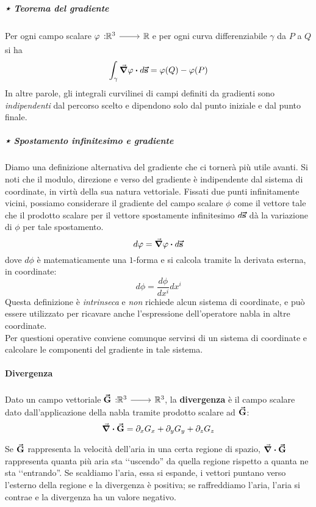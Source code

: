 \subparagraph{⋆ Teorema del gradiente}
\begin{theoremaqed}\label{thmgradiente}
	Per ogni campo scalare $\funz[\phi]{\realset^3}{\realset}$ e per ogni curva differenziabile $\gamma$ da $P$ a $Q$ si ha
	\begin{equation}
		\int_{\gamma}\grad{\phi}\vdot d\vba{s}=\phi(Q)-\phi(P)
	\end{equation}
	In altre parole, gli integrali curvilinei di campi definiti da gradienti sono \textit{indipendenti} dal percorso scelto e dipendono solo dal punto iniziale e dal punto finale.
\end{theoremaqed}
\subparagraph{⋆ Spostamento infinitesimo e gradiente}
Diamo una definizione alternativa del gradiente che ci tornerà più utile avanti. Si noti che il modulo, direzione e verso del gradiente è indipendente dal sistema di coordinate, in virtù della sua natura vettoriale. Fissati due punti infinitamente vicini, possiamo considerare il gradiente del campo scalare $\phi$ come il vettore tale che il prodotto scalare per il vettore spostamente infinitesimo $d\vb*{\va{s}}$ dà la variazione di $\phi$ per tale spostamento.
\begin{equation}
	d\phi=\grad{\phi}\vdot d\vba{s}\label{gradienteintrinseco}
\end{equation}
dove $d\phi$ è matematicamente una $1$-forma e si calcola tramite la derivata esterna, in coordinate:
\begin{equation}
	d\phi=\frac{d\phi}{dx^i}dx^i
\end{equation}
Questa definizione è \textit{intrinseca} e \textit{non} richiede alcun sistema di coordinate, e può essere utilizzato per ricavare anche l'espressione dell'operatore nabla in altre coordinate.\\
Per questioni operative conviene comunque servirsi di un sistema di coordinate e calcolare le componenti del gradiente in tale sistema.
\paragraph{Divergenza}
\begin{define}[Divergenza]
	Dato un campo vettoriale $\funz[\vba{G}]{\realset^3}{\realset^3}$, la \textbf{divergenza} è il campo scalare dato dall'applicazione della nabla tramite prodotto scalare ad $\vb*{\va{G}}$:
	\begin{equation}
		\div{\vb*{\va{G}}}=\partial_xG_x+\partial_yG_y+\partial_zG_z
	\end{equation}
\end{define}
\begin{example}
	Se $\vb*{\va{G}}$ rappresenta la velocità dell'aria in una certa regione di spazio, $\div{ \vb*{\va{G}}}$ rappresenta quanta più aria sta ‘‘uscendo'' da quella regione rispetto a quanta ne sta ‘‘entrando''. Se scaldiamo l'aria, essa si espande, i vettori puntano verso l'esterno della regione e la divergenza è positiva; se raffreddiamo l'aria, l'aria si contrae e la divergenza ha un valore negativo.
\end{example}

